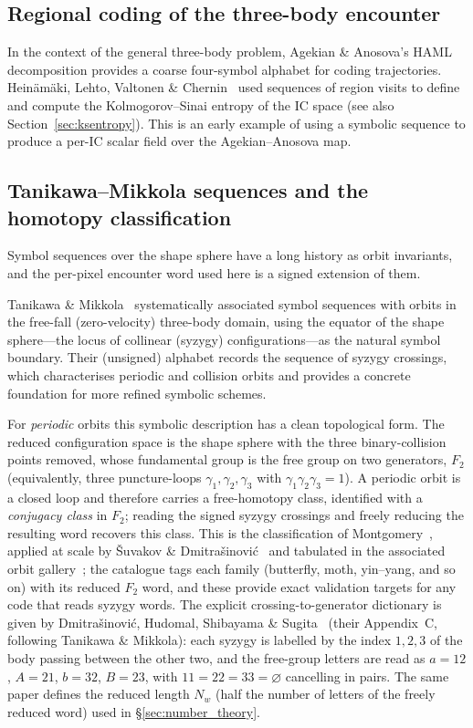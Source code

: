 \documentclass[11pt,a4paper]{article}
\begin{document}
\subsection{Regional coding of the three-body encounter}

In the context of the general three-body problem, Agekian \& Anosova's HAML decomposition
provides a coarse four-symbol alphabet for coding trajectories.  Heinäm\"{a}ki, Lehto, Valtonen
\& Chernin~\cite{chernin2000} used sequences of region visits to define and compute the
Kolmogorov--Sinai entropy of the IC space (see also Section~\ref{sec:ksentropy}).  This is
an early example of using a symbolic sequence to produce a per-IC scalar field over the
Agekian--Anosova map.

\subsection{Tanikawa--Mikkola sequences and the homotopy classification}

Symbol sequences over the shape sphere have a long history as orbit invariants, and the
per-pixel encounter word used here is a signed extension of them.

Tanikawa \& Mikkola~\cite{tanikawa2015,tanikawa2000} systematically associated symbol
sequences with orbits in the free-fall (zero-velocity) three-body domain, using the equator of
the shape sphere---the locus of collinear (syzygy) configurations---as the natural symbol
boundary.  Their (unsigned) alphabet records the sequence of syzygy crossings, which
characterises periodic and collision orbits and provides a concrete foundation for more refined
symbolic schemes.

For \emph{periodic} orbits this symbolic description has a clean topological form.  The reduced
configuration space is the shape sphere with the three binary-collision points removed, whose
fundamental group is the free group on two generators, $F_2$ (equivalently, three puncture-loops
$\gamma_1,\gamma_2,\gamma_3$ with $\gamma_1\gamma_2\gamma_3 = 1$).  A periodic orbit is a closed
loop and therefore carries a free-homotopy class, identified with a \emph{conjugacy class} in
$F_2$; reading the signed syzygy crossings and freely reducing the resulting word recovers this
class.  This is the classification of Montgomery~\cite{montgomery2015,montgomery1998}, applied
at scale by \v{S}uvakov \& Dmitra\v{s}inovi\'{c}~\cite{suvakov2013,suvakov2014} and tabulated in
the associated orbit gallery~\cite{threebodygallery}; the catalogue tags each family (butterfly,
moth, yin--yang, and so on) with its reduced $F_2$ word, and these provide exact validation
targets for any code that reads syzygy words.
The explicit crossing-to-generator dictionary is given by Dmitra\v{s}inovi\'{c}, Hudomal,
Shibayama \& Sugita~\cite{dmitrasinovic2018} (their Appendix~C, following Tanikawa \&
Mikkola): each syzygy is labelled by the index $1,2,3$ of the body passing between the other
two, and the free-group letters are read as $a = 12$, $A = 21$, $b = 32$, $B = 23$, with
$11 = 22 = 33 = \varnothing$ cancelling in pairs.  The same paper defines the reduced length
$N_w$ (half the number of letters of the freely reduced word) used in
\S\ref{sec:number_theory}.
\end{document}
